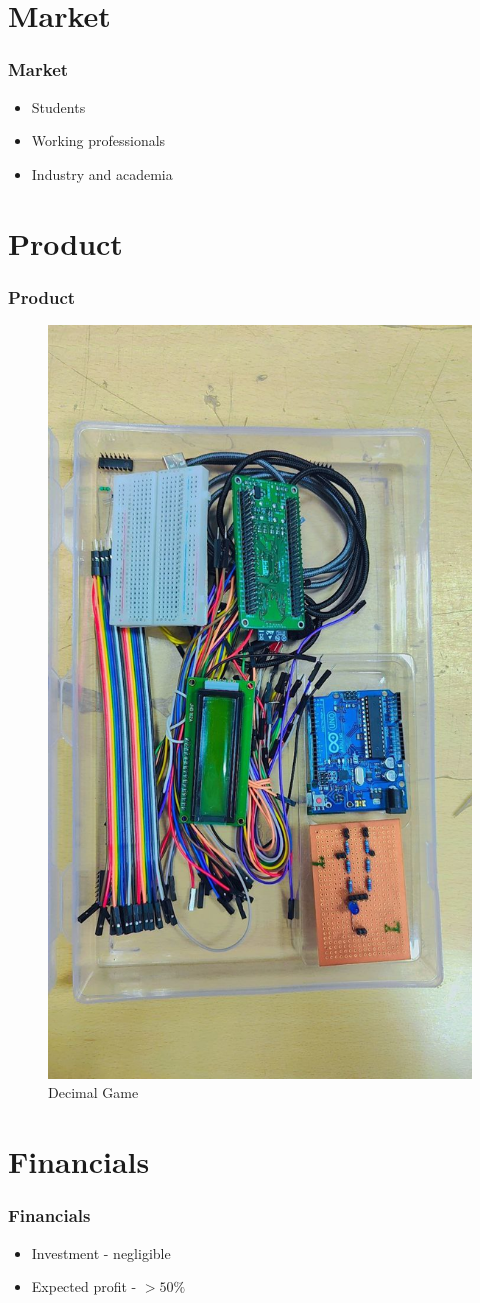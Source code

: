 \documentclass{beamer}
\theoremstyle{remark}
\begin{document}
\section{Market}
\begin{frame}
\frametitle{Market}
\begin{itemize}

\item Students 
\item Working professionals
\item Industry and academia
\end{itemize}
\end{frame}
\section{Product}
\begin{frame}
\frametitle{Product}
    \begin{figure}[t]
        \centering
        \includegraphics[width=0.3\columnwidth]{figs/kit}
        \caption{Decimal Game}
\label{fig3:subfig1}        
    \end{figure}%
\end{frame}
\section{Financials}
\begin{frame}
\frametitle{Financials}
\begin{itemize}
\item Investment - negligible
\item Expected profit - $> 50 \%$
\end{itemize}

\end{frame}
\end{document}

